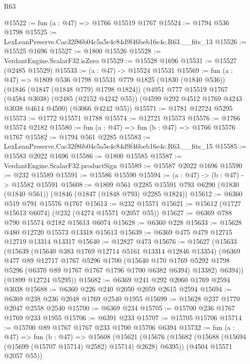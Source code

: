 \begin{lexlean}{R63}
\begin{coremodule}
@15522 := fun (a : @47) => @1766 @15519 @1767
@15524 := @1794 @536 @1798
@15525 := LexLeanPreserve.Cac32f86b04c5a5e4c84d9f46beb16e4c.R63.__fits_13
@15526 := @15525 @1696
@15527 := @1800 @15526
@15528 := VerdantEngine.ScalarF32.isZero
@15529 := @15528 @1696
@15531 := @15527 (@2485 @15529)
@15533 := (a : @47) -> @15524 @15531
@15569 := fun (a : @47) =>
  @1809
    @536
    @1798
    @15531
    @779
    @1825
    (@1830 (@1840 @536))
    (@1846 (@1847 (@1848 @779) @1798 @1824))
    (@4951
      @777
      @15519
      @1767
      (@4584 @3038)
      (@2485 (@2152 @4242 @55))
      (@4599 @292 @4512 @1769 @4243 @3038 @4614 @4500)
      (@3066 @4242 @55))
@15571 := @1781 @12724 @5295
@15573 := @1772 @15571 @1788
@15574 := @12721 @15573
@15576 := @1766 @15574 @2182
@15580 := fun (a : @47) => fun (b : @47) => @1766 @15576 @1767
@15582 := @1794 @561 @2285
@15583 := LexLeanPreserve.Cac32f86b04c5a5e4c84d9f46beb16e4c.R63.__fits_15
@15585 := @15583 @2022 @1696
@15586 := @1800 @15585
@15587 := VerdantEngine.ScalarF32.productSign
@15589 := @15587 @2022 @1696
@15590 := @232 @15589
@15591 := @15586 @15590
@15594 := (a : @47) -> (b : @47) -> @15582 @15591
@15608 := @1809
    @561
    @2285
    @15591
    @793
    @6290
    (@1830 (@1840 @561))
    (@1846 (@1847 (@1848 @793) @2285 @1824))
@15612 := @6360 @519 @791 @15576 @1767
@15613 := @232 @15571
@15621 := @15612 (@1727 @15613 @6074) (@232 (@4274 @15571 @2057 @55))
@15627 := @6369 @788 @790 @15574 @2182 @15613 @6074
@15628 := @6360 @228
@15633 := @15628 @480 @12720 @15573 @13318 @15613
@15639 := @6369 @475 @479 @12715 @12719 @13314 @13317
@15640 := @12827 @473
@15676 := @15627
    (@15633
      (@15639
        (@15640 @383 @1769 @12714 @5161 @13314 @12846 @13354)
        (@6369
          @477
          @89
          @12717
          @1767
          @5296
          @1700
          (@15640
            @170
            @1769
            @5292
            @1798
            @5296
            (@6370 @89 @1767 @1767 @1796 @1700 @6382 @6394)
            @13382)
          @6394))
      (@1899 @12724 @5295))
@15682 := @6369 @241 @292 @2060 @1769 @2594 @3038
@15688 := @6360 @226 @240 @2050 @2059 @2615 @2594
@15694 := @6369 @238 @236 @2048 @1769 @2540 @1955
@15699 := @15628 @237 @1770 @2047 @2558 @2540
@15700 := @6369 @234
@15705 := @15700 @236 @1767 @1769 @233 @1955
@15706 := @6391 @233
@15707 := @15705 @15706
@15714 := @15700 @89 @1767 @1767 @233 @1700 @15706 @6394
@15732 := fun (a : @47) =>
  fun (b : @47) =>
  @15608
    (@15621
      (@15676 (@15682 (@15688 (@15694 (@15699 (@15707 @15714) @2582) @15714) @2628) @6395))
      (@4504 @15571 @2057 @55))

\end{coremodule}
\end{lexlean}

